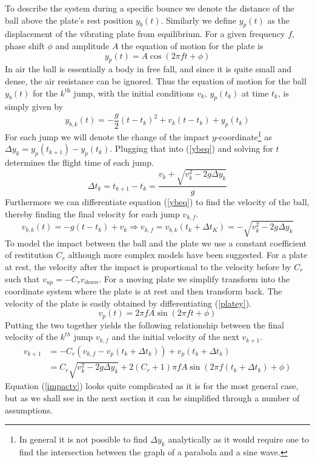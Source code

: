 \documentclass[12pt,oneside,a4paper]{article}
\numberwithin{equation}{section}
\begin{document}
{{{{To describe the system during a specific bounce we denote the distance of the ball above the plate's rest position $y_b(t)$. Similarly we define $y_p(t)$ as the displacement of the vibrating  plate from equilibrium. For a given frequency $f$, phase shift $\phi$ and amplitude $A$ the equation of motion for the plate is
\begin{equation}
	y_p(t)= A \cos(2\pi f t+ \phi)
	\label{platey}
\end{equation}
In air the ball is essentially a body in free fall, and since it is quite small and dense, the air resistance can be ignored. Thus the equation of motion for the ball $y_b(t)$ for the $k^\text{th}$ jump, with the initial conditions $v_k$, $y_p(t_k)$ at time $t_k$, is simply given by
\begin{equation}
	y_{b,k}(t) = -\frac{g}{2}(t-t_k)^2+v_k(t-t_k)+y_p(t_k)
	\label{ybeq}
\end{equation}
For each jump we will denote the change of the impact $y$-coordinate\footnote{In general it is not possible to find $\Delta y_k$ analytically as it would require one to find the intersection between the graph of a parabola and a sine wave.} as $\Delta y_{k}=y_p(t_{k+1})-y_p(t_{k})$. Plugging that into (\ref{ybeq}) and solving for $t$ determines the flight time of each jump.
\begin{equation}
	\Delta t_{k} = t_{k+1}-t_{k} = \frac{v_{k}+\sqrt{v_k^2-2g\Delta y_k}}{g}
	\label{flytime}
\end{equation}
Furthermore we can differentiate equation (\ref{ybeq}) to find the velocity of the ball, thereby finding the final velocity for each jump $v_{k,f}$.
\begin{equation}
	v_{b,k}(t) = -g(t-t_k)+v_k \Rightarrow v_{k,f} = v_{b,k}(t_k+\Delta t_K) = -\sqrt{v_k^2-2g\Delta y_k}
\end{equation}
To model the impact between the ball and the plate we use a constant coefficient of restitution $C_r$ although more complex models have been suggested\cite{muller}. For a plate at rest, the velocity after the impact is proportional to the velocity before by $C_r$ such that $v_{up}=-C_r v_{down}$. For a moving plate we simplify transform into the coordinate system where the plate is at rest and then transform back. The velocity of the plate is easily obtained by differentiating (\ref{platey}).
\begin{equation}
	v_p(t) = 2\pi f A \sin(2\pi f t+ \phi)
	\label{platev}
\end{equation}
Putting the two together yields the following relationship between the final velocity of the $k^{th}$ jump $v_{k,f}$ and the initial velocity of the next $v_{k+1}$.
\begin{align}
	v_{k+1} &= -C_r(v_{k,f}-v_p(t_k+\Delta t_k))+v_p(t_k+\Delta t_k) \nonumber \\
	&= C_r \sqrt{v_k^2-2g\Delta y_k}+2(C_r+1)\pi f A \sin(2\pi f (t_k+\Delta t_k)+ \phi) \label{impactv}
\end{align}
Equation (\ref{impactv}) looks quite complicated as it is for the most general case, but as we shall see in the next section it can be simplified through a number of assumptions.

}}}}
\end{document}
